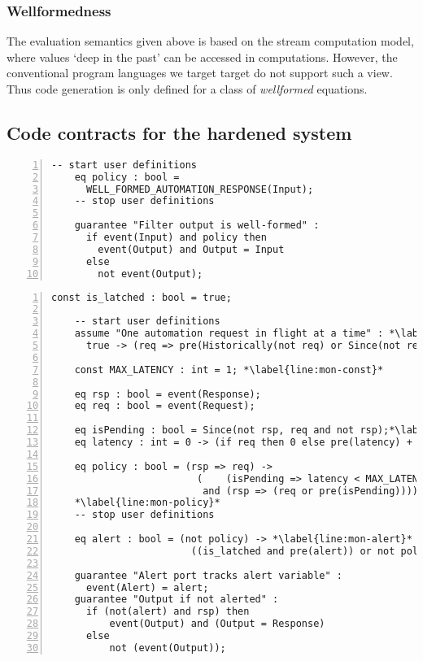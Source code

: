 \subsubsection*{Wellformedness}
The evaluation semantics given above is based on the stream
computation model, where values `deep in the past' can be accessed in
computations. However, the conventional program languages we target
target do not support such a view. Thus code generation is only
defined for a class of \emph{wellformed} equations.

\begin{definition}[Wellformedness]
\end{definition}

\subsection{Code contracts for the hardened system}

\newsavebox{\flt}
\begin{lrbox}{\flt}
  \begin{lstlisting}[style=agree,numbers=left]
    -- start user definitions
    eq policy : bool =
      WELL_FORMED_AUTOMATION_RESPONSE(Input);
    -- stop user definitions

    guarantee "Filter output is well-formed" :
      if event(Input) and policy then
        event(Output) and Output = Input
      else
        not event(Output);
  \end{lstlisting}
\end{lrbox}

\newsavebox{\mntr}
\begin{lrbox}{\mntr}
  \begin{lstlisting}[style=agree,numbers=left]
    const is_latched : bool = true;

    -- start user definitions
    assume "One automation request in flight at a time" : *\label{line:mon-assume}*
      true -> (req => pre(Historically(not req) or Since(not req, rsp)));

    const MAX_LATENCY : int = 1; *\label{line:mon-const}*

    eq rsp : bool = event(Response);
    eq req : bool = event(Request);

    eq isPending : bool = Since(not rsp, req and not rsp);*\label{line:mon-pending}*
    eq latency : int = 0 -> (if req then 0 else pre(latency) + 1);*\label{line:mon-latency}*

    eq policy : bool = (rsp => req) ->
                         (    (isPending => latency < MAX_LATENCY)
                          and (rsp => (req or pre(isPending))));
    *\label{line:mon-policy}*
    -- stop user definitions

    eq alert : bool = (not policy) -> *\label{line:mon-alert}*
                        ((is_latched and pre(alert)) or not policy);

    guarantee "Alert port tracks alert variable" :
      event(Alert) = alert;
    guarantee "Output if not alerted" :
      if (not(alert) and rsp) then
          event(Output) and (Output = Response)
      else
          not (event(Output));
  \end{lstlisting}
\end{lrbox}

